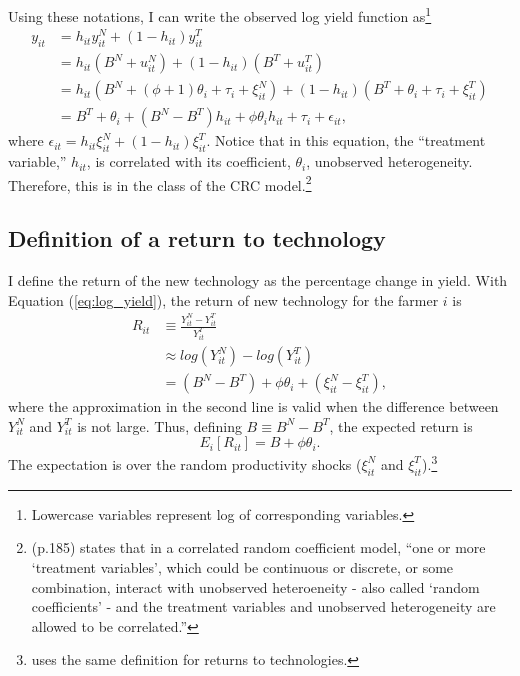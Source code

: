\documentclass[11pt,letterpaper]{article}
\begin{document}
Using these notations, I can write the observed log yield function as\footnote{Lowercase variables represent log of corresponding variables.}
\begin{align}\label{eq:log_yield}
  y_{it} &= h_{it} y_{it}^N + (1 - h_{it}) y_{it}^T \nonumber \\
  &= h_{it} (B^N + u_{it}^N) + (1 - h_{it}) (B^T + u_{it}^T) \nonumber \\
  &= h_{it} (B^N + (\phi + 1) \theta_i + \tau_i + \xi_{it}^N) + (1 - h_{it}) (B^T + \theta_i + \tau_i + \xi_{it}^T) \nonumber \\
  &= B^T + \theta_i + (B^N - B^T) h_{it} + \phi \theta_i h_{it} + \tau_i + \epsilon_{it},
\end{align}
where $\epsilon_{it} = h_{it} \xi_{it}^N + (1 - h_{it}) \xi_{it}^T$.
Notice that in this equation, the ``treatment variable,'' $h_{it}$, is correlated with its coefficient, $\theta_i$, unobserved heterogeneity.
Therefore, this is in the class of the CRC model.\footnote{
  \citet{Wooldridge03} (p.185) states that in a correlated random coefficient model, ``one or more `treatment variables', which could be continuous or discrete, or some combination, interact with unobserved heteroeneity - also called `random coefficients' - and the treatment variables and unobserved heterogeneity are allowed to be correlated.''
}

\subsection{Definition of a return to technology}

I define the return of the new technology as the percentage change in yield.
With Equation (\ref{eq:log_yield}), the return of new technology for the farmer $i$ is
\begin{align*}
  R_{it} &\equiv \frac{Y_{it}^{N} - Y_{it}^{T}}{Y_{it}^{T}} \\
         &\approx log(Y_{it}^{N}) - log(Y_{it}^{T}) \\
         &= (B^N - B^T) + \phi \theta_i + (\xi_{it}^N - \xi_{it}^T),
\end{align*}
where the approximation in the second line is valid when the difference between $Y_{it}^N$ and $Y_{it}^T$ is not large.
Thus, defining $B \equiv B^N - B^T$, the expected return is 
\begin{equation*}
  E_i[R_{it}] = B + \phi \theta_i.
\end{equation*}
The expectation is over the random productivity shocks ($\xi_{it}^N$ and $\xi_{it}^T$).\footnote{
  \citet{Suri11} uses the same definition for returns to technologies.
}
\end{document}
